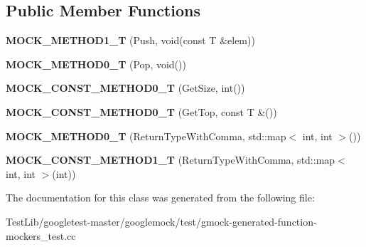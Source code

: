 \subsection*{Public Member Functions}
\begin{DoxyCompactItemize}
\item 
\mbox{\label{classtesting_1_1gmock__generated__function__mockers__test_1_1MockStack_a0ad833bc6134c5150b8271a5ba2e91b5}} 
{\bfseries M\+O\+C\+K\+\_\+\+M\+E\+T\+H\+O\+D1\+\_\+T} (Push, void(const T \&elem))
\item 
\mbox{\label{classtesting_1_1gmock__generated__function__mockers__test_1_1MockStack_a5e55ffb22e7f11c6940a97bd001bd50c}} 
{\bfseries M\+O\+C\+K\+\_\+\+M\+E\+T\+H\+O\+D0\+\_\+T} (Pop, void())
\item 
\mbox{\label{classtesting_1_1gmock__generated__function__mockers__test_1_1MockStack_a6171be20e8e4f44464cc8968e05b7c7a}} 
{\bfseries M\+O\+C\+K\+\_\+\+C\+O\+N\+S\+T\+\_\+\+M\+E\+T\+H\+O\+D0\+\_\+T} (Get\+Size, int())
\item 
\mbox{\label{classtesting_1_1gmock__generated__function__mockers__test_1_1MockStack_ae5950cfac08382a0ffc7c3bd5aba405f}} 
{\bfseries M\+O\+C\+K\+\_\+\+C\+O\+N\+S\+T\+\_\+\+M\+E\+T\+H\+O\+D0\+\_\+T} (Get\+Top, const T \&())
\item 
\mbox{\label{classtesting_1_1gmock__generated__function__mockers__test_1_1MockStack_a4b67d1f5b795e7c072fb846217a8f130}} 
{\bfseries M\+O\+C\+K\+\_\+\+M\+E\+T\+H\+O\+D0\+\_\+T} (Return\+Type\+With\+Comma, std\+::map$<$ int, int $>$())
\item 
\mbox{\label{classtesting_1_1gmock__generated__function__mockers__test_1_1MockStack_a69b9a7d0231b729d8a47201a49fa9166}} 
{\bfseries M\+O\+C\+K\+\_\+\+C\+O\+N\+S\+T\+\_\+\+M\+E\+T\+H\+O\+D1\+\_\+T} (Return\+Type\+With\+Comma, std\+::map$<$ int, int $>$(int))
\end{DoxyCompactItemize}


The documentation for this class was generated from the following file\+:\begin{DoxyCompactItemize}
\item 
Test\+Lib/googletest-\/master/googlemock/test/gmock-\/generated-\/function-\/mockers\+\_\+test.\+cc\end{DoxyCompactItemize}
